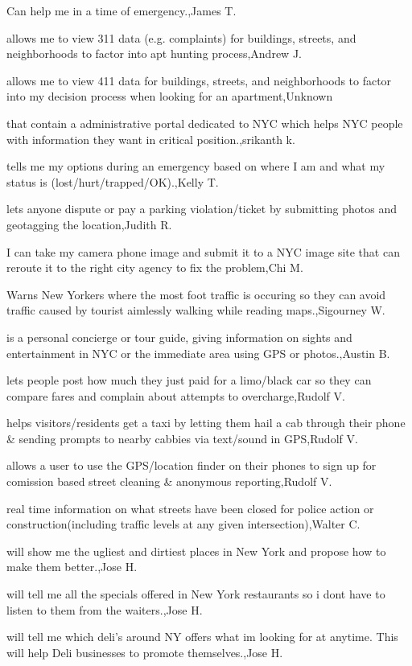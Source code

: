 \documentclass{article}
\begin{document}
Can help me in a time of emergency.,James T.

allows me to view 311 data (e.g. complaints) for buildings, streets, and neighborhoods to factor into apt hunting process,Andrew J.

allows me to view 411 data for buildings, streets, and neighborhoods to factor into my decision process when looking for an apartment,Unknown

that contain a administrative portal dedicated to NYC which helps NYC people with information they want in critical position.,srikanth k.

tells me my options during an emergency based on where I am and what my status is (lost/hurt/trapped/OK).,Kelly T.

lets anyone dispute or pay a parking violation/ticket by submitting photos and geotagging the location,Judith R.

I can take my camera phone image and submit it to a NYC image site that can reroute it to the right city agency to fix the problem,Chi  M.

Warns New Yorkers where the most foot traffic is occuring so they can avoid traffic caused by tourist aimlessly walking while reading maps.,Sigourney W.

is a personal concierge or tour guide, giving information on sights and entertainment in NYC or the immediate area using GPS or photos.,Austin B.

lets people post how much they just paid for a limo/black car so they can compare fares and complain about attempts to overcharge,Rudolf V.

helps visitors/residents get a taxi by letting them hail a cab through their phone \& sending prompts to nearby cabbies via text/sound in GPS,Rudolf V.

allows a user to use the GPS/location finder on their phones to sign up for comission based street cleaning \& anonymous reporting,Rudolf V.

real time information on what streets have been closed for police action or construction(including traffic levels at any given intersection),Walter C.

will show me  the ugliest and dirtiest  places in New York and propose how to make them better.,Jose H.

will tell me all the specials offered in New York restaurants so i dont have to listen to them from the waiters.,Jose H.

will tell me which deli's around NY offers what im looking for at anytime. This will help Deli businesses to promote themselves.,Jose H.
\end{document}
